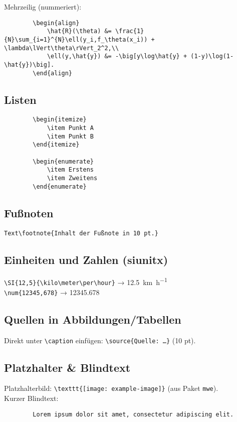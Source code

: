 \documentclass[11pt,a4paper]{article}
\makeatletter
\newcommand{\source}[1]{\caption*{\footnotesize #1}} %
\renewcommand\footnotesize{\@setfontsize\footnotesize{10pt}{12pt}}
\makeatother
\begin{document}
    Mehrzeilig (nummeriert):
    \begin{verbatim}
        \begin{align}
            \hat{R}(\theta) &= \frac{1}{N}\sum_{i=1}^{N}\ell(y_i,f_\theta(x_i)) + \lambda\lVert\theta\rVert_2^2,\\
            \ell(y,\hat{y}) &= -\big[y\log\hat{y} + (1-y)\log(1-\hat{y})\big].
        \end{align}
    \end{verbatim}

    \subsection*{Listen}
    \begin{verbatim}
        \begin{itemize}
            \item Punkt A
            \item Punkt B
        \end{itemize}

        \begin{enumerate}
            \item Erstens
            \item Zweitens
        \end{enumerate}
    \end{verbatim}

    \subsection*{Fußnoten}
    \verb|Text\footnote{Inhalt der Fußnote in 10 pt.}|

    \subsection*{Einheiten und Zahlen (siunitx)}
    \verb|\SI{12,5}{\kilo\meter\per\hour}| → \SI{12,5}{\kilo\meter\per\hour}\\
    \verb|\num{12345,678}| → \num{12345,678}

    \subsection*{Quellen in Abbildungen/Tabellen}
    Direkt unter \verb|\caption| einfügen: \verb|\source{Quelle: …}| (10 pt).

    \subsection*{Platzhalter \& Blindtext}
    Platzhalterbild: \verb|\texttt{[image: example-image]}| (aus Paket \verb|mwe|).\\
    Kurzer Blindtext:
    \begin{verbatim}
        Lorem ipsum dolor sit amet, consectetur adipiscing elit.
    \end{verbatim}
\end{document}
